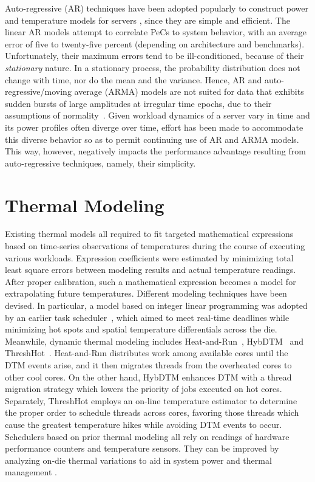 Auto-regressive (AR) techniques have been adopted popularly to construct
power and temperature models for servers
\cite{Coskun2008,Powell2009,Bircher2011}, since they are simple and
efficient.  The linear AR models attempt to correlate PeCs to system
behavior, with an average error of five to twenty-five percent
(depending on architecture and benchmarks).  Unfortunately, their
maximum errors tend to be ill-conditioned, because of their
\textit{stationary} nature.  In a stationary process, the probability
distribution does not change with time, nor do the mean and the
variance.  Hence, AR and auto-regressive/moving average (ARMA) models
are not suited for data that exhibits sudden bursts of large amplitudes
at irregular time epochs, due to their assumptions of
normality~\cite{Tong1993}.  Given workload dynamics of a server vary in
time and its power profiles often diverge over time, effort has been
made to accommodate this diverse behavior
\cite{MesaMartinez2007,Coskun2008} so as to permit continuing use of AR
and ARMA models.  This way, however, negatively impacts the performance
advantage resulting from auto-regressive techniques, namely, their
simplicity.

\section{Thermal Modeling}
\label{sec:related-thermal-modeling}
Existing thermal models all required to fit targeted mathematical
expressions based on time-series observations of temperatures during the
course of executing various workloads.  Expression coefficients were
estimated by minimizing total least square errors between modeling
results and actual temperature readings.  After proper calibration, such
a mathematical expression becomes a model for extrapolating future
temperatures.  Different modeling techniques have been devised.  In
particular, a model based on integer linear programming was adopted by
an earlier task scheduler~\cite{Kursun2009}, which aimed to meet
real-time deadlines while minimizing hot spots and spatial temperature
differentials across the die.  Meanwhile, dynamic thermal modeling
includes Heat-and-Run~\cite{Gomaa2004}, HybDTM~\cite{Ayoub2011} and
ThreshHot~\cite{Yang2008}.  Heat-and-Run distributes
work among available cores until the DTM events arise, and it then
migrates threads from the overheated cores to other cool cores.  On the
other hand, HybDTM enhances DTM with a thread migration strategy which
lowers the priority of jobs executed on hot cores.  Separately,
ThreshHot employs an on-line temperature estimator to determine the
proper order to schedule threads across cores, favoring those threads
which cause the greatest temperature hikes while avoiding DTM events to
occur.  Schedulers based on prior thermal modeling all rely on readings
of hardware performance counters and temperature sensors.  They can be
improved by analyzing on-die thermal variations to aid in system power
and thermal management \cite{Kursun2009,Bailis2011,Murali2008}.

